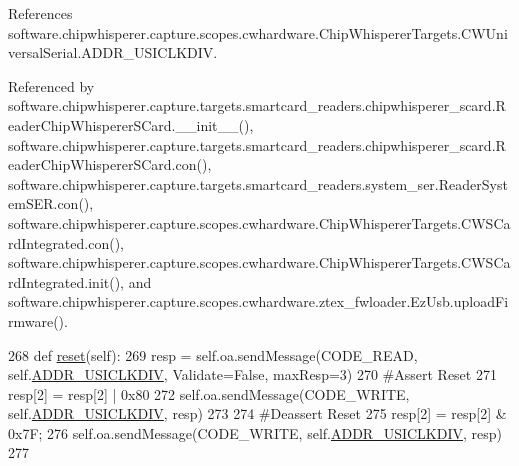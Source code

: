 References software.\+chipwhisperer.\+capture.\+scopes.\+cwhardware.\+Chip\+Whisperer\+Targets.\+C\+W\+Universal\+Serial.\+A\+D\+D\+R\+\_\+\+U\+S\+I\+C\+L\+K\+D\+I\+V.



Referenced by software.\+chipwhisperer.\+capture.\+targets.\+smartcard\+\_\+readers.\+chipwhisperer\+\_\+scard.\+Reader\+Chip\+Whisperer\+S\+Card.\+\_\+\+\_\+init\+\_\+\+\_\+(), software.\+chipwhisperer.\+capture.\+targets.\+smartcard\+\_\+readers.\+chipwhisperer\+\_\+scard.\+Reader\+Chip\+Whisperer\+S\+Card.\+con(), software.\+chipwhisperer.\+capture.\+targets.\+smartcard\+\_\+readers.\+system\+\_\+ser.\+Reader\+System\+S\+E\+R.\+con(), software.\+chipwhisperer.\+capture.\+scopes.\+cwhardware.\+Chip\+Whisperer\+Targets.\+C\+W\+S\+Card\+Integrated.\+con(), software.\+chipwhisperer.\+capture.\+scopes.\+cwhardware.\+Chip\+Whisperer\+Targets.\+C\+W\+S\+Card\+Integrated.\+init(), and software.\+chipwhisperer.\+capture.\+scopes.\+cwhardware.\+ztex\+\_\+fwloader.\+Ez\+Usb.\+upload\+Firmware().


\begin{DoxyCode}
268     \textcolor{keyword}{def }\hyperlink{classsoftware_1_1chipwhisperer_1_1capture_1_1scopes_1_1cwhardware_1_1ChipWhispererTargets_1_1CWUniversalSerial_a971fe5c3288ae34ef3a3cbf70e94ed3c}{reset}(self):
269         resp = self.oa.sendMessage(CODE\_READ, self.\hyperlink{classsoftware_1_1chipwhisperer_1_1capture_1_1scopes_1_1cwhardware_1_1ChipWhispererTargets_1_1CWUniversalSerial_abcfde3f48091968528c889cceff0b7a4}{ADDR\_USICLKDIV}, Validate=\textcolor{keyword}{False}, maxResp=3)
270         \textcolor{comment}{#Assert Reset}
271         resp[2] = resp[2] | 0x80
272         self.oa.sendMessage(CODE\_WRITE, self.\hyperlink{classsoftware_1_1chipwhisperer_1_1capture_1_1scopes_1_1cwhardware_1_1ChipWhispererTargets_1_1CWUniversalSerial_abcfde3f48091968528c889cceff0b7a4}{ADDR\_USICLKDIV}, resp)
273 
274         \textcolor{comment}{#Deassert Reset}
275         resp[2] = resp[2] & 0x7F;
276         self.oa.sendMessage(CODE\_WRITE, self.\hyperlink{classsoftware_1_1chipwhisperer_1_1capture_1_1scopes_1_1cwhardware_1_1ChipWhispererTargets_1_1CWUniversalSerial_abcfde3f48091968528c889cceff0b7a4}{ADDR\_USICLKDIV}, resp)          
277 
\end{DoxyCode}
\hypertarget{classsoftware_1_1chipwhisperer_1_1capture_1_1scopes_1_1cwhardware_1_1ChipWhispererTargets_1_1CWUniversalSerial_a5028747892a017fe070ac984ab036751}{}
